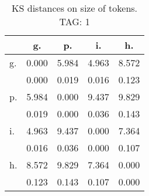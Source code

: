 \begin{table}[h!]
\begin{center}
\begin{tabular}{| l | c | c | c | c |}\hline
 & g. & p. & i. & h. \\\hline
g. & 0.000  & 5.984  & 4.963  & 8.572 \\\hline
 & 0.000  & 0.019  & 0.016  & 0.123 \\\hline
p. & 5.984  & 0.000  & 9.437  & 9.829 \\\hline
 & 0.019  & 0.000  & 0.036  & 0.143 \\\hline
i. & 4.963  & 9.437  & 0.000  & 7.364 \\\hline
 & 0.016  & 0.036  & 0.000  & 0.107 \\\hline
h. & 8.572  & 9.829  & 7.364  & 0.000 \\\hline
 & 0.123  & 0.143  & 0.107  & 0.000 \\\hline
\end{tabular}
\caption{KS distances on size of tokens. TAG: 1}
\end{center}
\end{table}